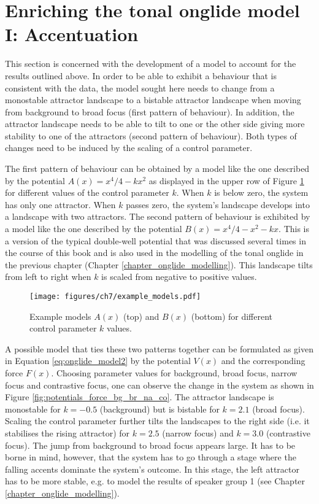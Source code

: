 \section{Enriching the tonal onglide model I: Accentuation}

This section is concerned with the development of a model to account for the results outlined above. In order to be able to exhibit a behaviour that is consistent with the data, the model sought here needs to change from a monostable attractor landscape to a bistable attractor landscape when moving from background to broad focus (first pattern of behaviour). In addition, the attractor landscape needs to be able to tilt to one or the other side giving more stability to one of the attractors (second pattern of behaviour). Both types of changes need to be induced by the scaling of a control parameter.

The first pattern of behaviour can be obtained by a model like the one described by the potential $A(x) = x^4/4 - kx^2$ as displayed in the upper row of Figure \ref{fig:example_models} for different values of the control parameter $k$. When $k$ is below zero, the system has only one attractor. When $k$ passes zero, the system's landscape develops into a landscape with two attractors. The second pattern of behaviour is exhibited by a model like the one described by the potential $B(x) = x^4/4 - x^2 - kx$. This is a version of the typical double-well potential that was discussed several times in the course of this book and is also used in the modelling of the tonal onglide in the previous chapter (Chapter \ref{chapter_onglide_modelling}). This landscape tilts from left to right when $k$ is scaled from negative to positive values.

\begin{figure}
\texttt{[image: figures/ch7/example\_models.pdf]}
\caption[Example models $A(x)$ and $B(x)$.]{Example models $A(x)$ (top) and $B(x)$ (bottom) for different control parameter $k$ values.}
\label{fig:example_models}
\end{figure}

\newpage
A possible model that ties these two patterns together can be formulated as given in Equation \ref{eq:onglide_model2} by the potential $V(x)$ and the corresponding force $F(x)$. Choosing parameter values for background, broad focus, narrow focus and contrastive focus, one can observe the change in the system as shown in Figure \ref{fig:potentials_force_bg_br_na_co}. The attractor landscape is monostable for $k = -0.5$ (background) but is bistable for $k = 2.1$ (broad focus). Scaling the control parameter further tilts the landscapes to the right side (i.e. it stabilises the rising attractor) for $k = 2.5$ (narrow focus) and $k = 3.0$ (contrastive focus). The jump from background to broad focus appears large. It has to be borne in mind, however, that the system has to go through a stage where the falling accents dominate the system's outcome. In this stage, the left attractor has to be more stable, e.g. to model the results of speaker group 1 (see Chapter \ref{chapter_onglide_modelling}).

